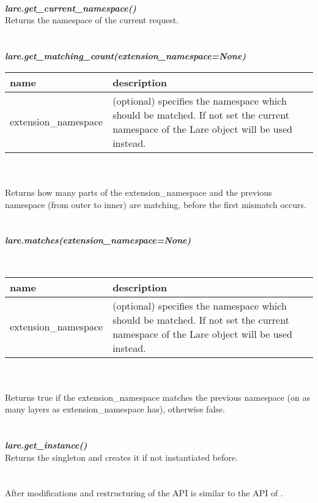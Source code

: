 \\
\\
\\
\large{\textbf{\textit{lare.get\_current\_namespace()}}
\\
Returns the namespace of the current request.
\\
\\
\\
\large{\textbf{\textit{lare.get\_matching\_count(extension\_namespace=None)}}}
\\
\begin{tabular}{|p{4cm}|p{8cm}|}
    \hline
    \textbf{name} & \textbf{description} \\
    \hline
    extension\_namespace & (optional) specifies the namespace which should be matched. If not set the current namespace of the Lare object will be used instead. \\
    \hline
\end{tabular}
\\
\\
Returns how many parts of the extension\_namespace and the previous namespace (from outer to inner) are matching, before the first mismatch occurs.
\\
\\
\\
\large{\textbf{\textit{lare.matches(extension\_namespace=None)}}}}
\\
\begin{tabular}{|p{4cm}|p{8cm}|}
    \hline
    \textbf{name} & \textbf{description} \\
    \hline
    extension\_namespace & (optional) specifies the namespace which should be matched. If not set the current namespace of the Lare object will be used instead. \\
    \hline
\end{tabular}
\\
\\
Returns true if the extension\_namespace matches the previous namespace (on as many layers as extension\_namespace has), otherwise false.
\\
\\
\\
\large{\textbf{\textit{lare.get\_instance()}}}
\\
Returns the \lare{} singleton and creates it if not instantiated before.
\\
\\
\\
After modifications and restructuring of \djangoLare{} the API is similar to the API of \phpLare{}.


